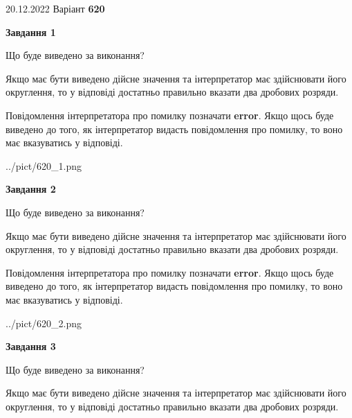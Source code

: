 \documentclass[12pt, ukrainian]{article}
\begin{document}
{20.12.2022 Варіант \No \textbf { 620 }\par}
{
\begin {Large}

{\begin {center}\textbf{Завдання 1}\end {center}}\par
Що буде виведено за виконання? \par

Якщо має бути виведено дійсне значення та інтерпретатор має здійснювати його округлення, 
то у відповіді достатньо правильно вказати два дробових розряди.

Повідомлення інтерпретатора про помилку позначати \textbf{error}.
Якщо щось буде виведено до того, як інтерпретатор видасть повідомлення про помилку, 
то воно має вказуватись у відповіді. \par

\begin{center}
	{../pict/620_1.png}
\end{center}
\newpage

{\begin {center}\textbf{Завдання 2}\end {center}}\par
Що буде виведено за виконання? \par

Якщо має бути виведено дійсне значення та інтерпретатор має здійснювати його округлення, 
то у відповіді достатньо правильно вказати два дробових розряди.

Повідомлення інтерпретатора про помилку позначати \textbf{error}.
Якщо щось буде виведено до того, як інтерпретатор видасть повідомлення про помилку, 
то воно має вказуватись у відповіді. \par

\begin{center}
	{../pict/620_2.png}
\end{center}
\newpage

{\begin {center}\textbf{Завдання 3}\end {center}}\par
Що буде виведено за виконання? \par

Якщо має бути виведено дійсне значення та інтерпретатор має здійснювати його округлення, 
то у відповіді достатньо правильно вказати два дробових розряди.


\end{Large}}
\end{document}
